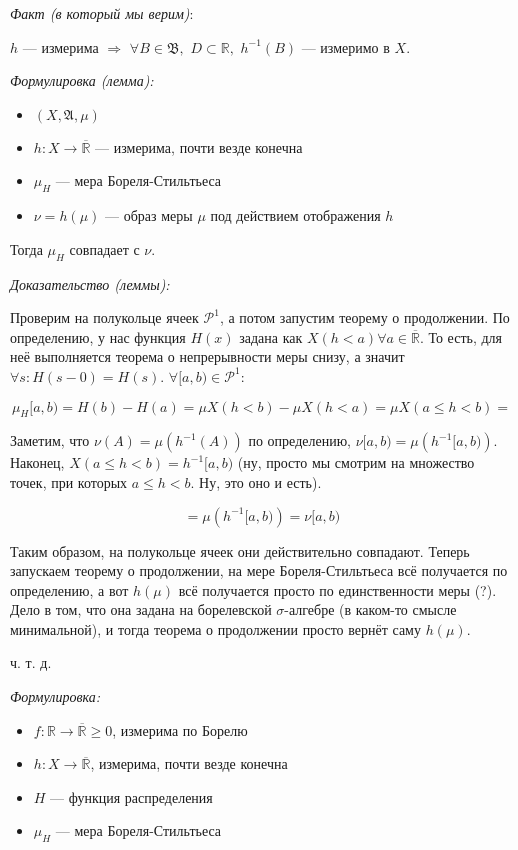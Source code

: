 \documentclass{article}
\def\dbl{\,\,}
\def\rinf{\overline{\mathbb{R}}}
\begin{document}
\textit{Факт (в который мы верим)}:

$h$ --- измерима $\Rightarrow \dbl \forall B \in \mathfrak{B}, \dbl D \subset \mathbb{R}, \dbl h^{-1}(B)$ --- измеримо в $X$.

\textit{Формулировка (лемма):}

\begin{itemize}
    \item $(X, \mathfrak{A}, \mu)$
    \item $h: X \rightarrow \rinf$ --- измерима, почти везде конечна
    \item $\mu_H$ --- мера Бореля-Стильтьеса
    \item $\nu = h(\mu)$ --- образ меры $\mu$ под действием отображения $h$
\end{itemize}

Тогда $\mu_H$ совпадает с $\nu$.

\textit{Доказательство (леммы):}

Проверим на полукольце ячеек $\mathcal{P}^1$, а потом запустим теорему о продолжении. По определению, у нас функция $H(x)$ задана как $X(h < a) \forall a \in \rinf$. То есть, для неё выполняется теорема о непрерывности меры снизу, а значит $\forall s: H(s - 0) = H(s)$. $\forall [a, b) \in \mathcal{P}^1$:

\[\mu_H[a, b) = H(b) - H(a) = \mu X(h < b) - \mu X(h < a) = \mu X(a \le h < b) = \]

Заметим, что $\nu(A) = \mu(h^{-1}(A))$ по определению, $\nu [a, b) = \mu\left(h^{-1} [a, b)\right)$. Наконец, $X(a \le h < b) = h^{-1}[a, b)$ (ну, просто мы смотрим на множество точек, при которых $a \le h < b$. Ну, это оно и есть).

\[ = \mu\left(h^{-1} [a, b)\right) = \nu [a, b)\]

Таким образом, на полукольце ячеек они действительно совпадают. Теперь запускаем теорему о продолжении, на мере Бореля-Стильтьеса всё получается по определению, а вот $h(\mu)$ всё получается просто по единственности меры (?). Дело в том, что она задана на борелевской $\sigma$-алгебре (в каком-то смысле минимальной), и тогда теорема о продолжении просто вернёт саму $h(\mu)$.

ч. т. д. 

\textit{Формулировка:}

\begin{itemize}
    \item $f: \mathbb{R} \rightarrow \rinf \ge 0$, измерима по Борелю
    \item $h: X \rightarrow \rinf$, измерима, почти везде конечна
    \item $H$ --- функция распределения
    \item $\mu_{H}$ --- мера Бореля-Стильтьеса
\end{itemize}
\end{document}
